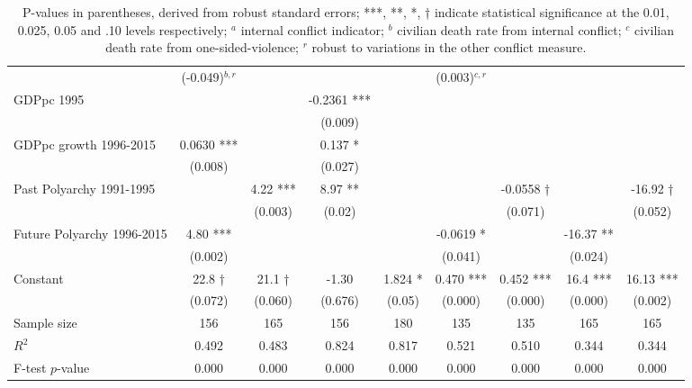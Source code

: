 \documentclass[12pt]{article}
\begin{document}
\begin{table}
\begin{tabular}{lcccccccc}
                               & (-0.049)$^{b,r}$&                 &             &            & (0.003)$^{c,r}$ &             &            & \\
GDPpc 1995                     &                 &                 & -0.2361 *** &            &                 &             &            & \\
                               &                 &                 & (0.009)     &            &                 &             &            & \\
GDPpc growth 1996-2015         & 0.0630 ***      &                 & 0.137 *     &            &                 &             &            & \\
                               & (0.008)         &                 & (0.027)     &            &                 &             &            & \\
Past Polyarchy 1991-1995       &                 & 4.22 ***        & 8.97 **     &            &                 & -0.0558 †   &            & -16.92 † \\
                               &                 & (0.003)         & (0.02)      &            &                 & (0.071)     &            & (0.052) \\
Future Polyarchy 1996-2015     & 4.80 ***        &                 &             &            & -0.0619 *       &             & -16.37 **  & \\
                               & (0.002)         &                 &             &            & (0.041)         &             & (0.024)    & \\
Constant                       & 22.8 †          & 21.1 †          & -1.30       & 1.824 *    & 0.470 ***       & 0.452 ***   & 16.4 ***   & 16.13 *** \\
                               & (0.072)         & (0.060)         & (0.676)     & (0.05)     & (0.000)         & (0.000)     & (0.000)    & (0.002) \\
\midrule
Sample size                    & 156             & 165             & 156         & 180        & 135             & 135         & 165        & 165 \\
$R^2$                          & 0.492           & 0.483           & 0.824       & 0.817      & 0.521           & 0.510       & 0.344      & 0.344 \\
F-test $p$-value               & 0.000           & 0.000           & 0.000       & 0.000      & 0.000           & 0.000       & 0.000      & 0.000 \\
\bottomrule
\end{tabular}
\caption*{P-values in parentheses, derived from robust standard errors; ***, **, *, † indicate statistical significance at the 0.01, 0.025, 0.05 and .10 levels respectively; $^a$ internal conflict indicator; $^b$ civilian death rate from internal conflict; $^c$ civilian death rate from one-sided-violence; $^r$ robust to variations in the other conflict measure.}
\end{table}
\end{document}
